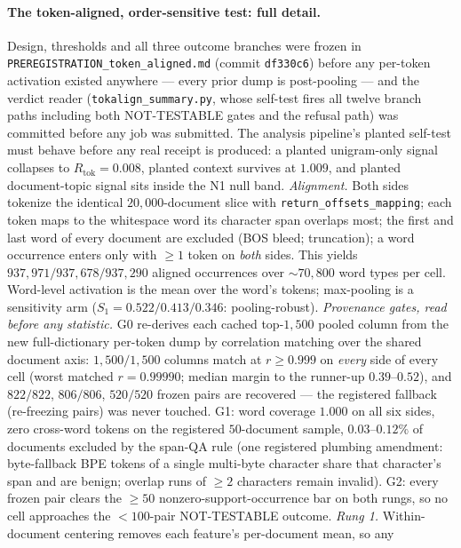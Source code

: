 \paragraph{The token-aligned, order-sensitive test: full detail.}\label{app:tokalign}
Design, thresholds and all three outcome branches were frozen in
\texttt{PREREGISTRATION\_token\_aligned.md} (commit \texttt{df330c6}) before any per-token
activation existed anywhere --- every prior dump is post-pooling --- and the verdict reader
(\texttt{tokalign\_summary.py}, whose self-test fires all twelve branch paths including both
NOT-TESTABLE gates and the refusal path) was committed before any job was submitted. The
analysis pipeline's planted self-test must behave before any real receipt is produced: a
planted unigram-only signal collapses to $R_{\text{tok}}{=}0.008$, planted context survives
at $1.009$, and planted document-topic signal sits inside the N1 null band.
\emph{Alignment.} Both sides tokenize the identical $20{,}000$-document slice with
\texttt{return\_offsets\_mapping}; each token maps to the whitespace word its character span
overlaps most; the first and last word of every document are excluded (BOS bleed; truncation);
a word occurrence enters only with $\ge1$ token on \emph{both} sides. This yields
$937{,}971/937{,}678/937{,}290$ aligned occurrences over ${\sim}70{,}800$ word types per
cell. Word-level activation is the mean over the word's tokens; max-pooling is a sensitivity
arm ($S_1=0.522/0.413/0.346$: pooling-robust).
\emph{Provenance gates, read before any statistic.} G0 re-derives each cached top-$1{,}500$
pooled column from the new full-dictionary per-token dump by correlation matching over the
shared document axis: $1{,}500/1{,}500$ columns match at $r\ge0.999$ on \emph{every} side of
every cell (worst matched $r=0.99990$; median margin to the runner-up $0.39$--$0.52$), and
$822/822$, $806/806$, $520/520$ frozen pairs are recovered --- the registered fallback
(re-freezing pairs) was never touched. G1: word coverage $1.000$ on all six sides, zero
cross-word tokens on the registered $50$-document sample, $0.03$--$0.12\%$ of documents
excluded by the span-QA rule (one registered plumbing amendment: byte-fallback BPE tokens of
a single multi-byte character share that character's span and are benign; overlap runs of
$\ge2$ characters remain invalid). G2: every frozen pair clears the $\ge50$
nonzero-support-occurrence bar on both rungs, so no cell approaches the $<100$-pair
NOT-TESTABLE outcome.
\emph{Rung 1.} Within-document centering removes each feature's per-document mean, so any
